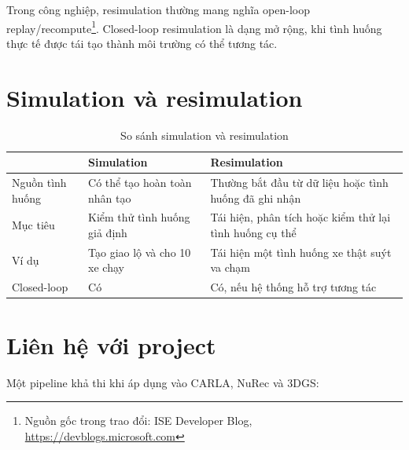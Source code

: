 Trong công nghiệp, resimulation thường mang nghĩa open-loop replay/recompute\footnote{Nguồn gốc trong trao đổi: ISE Developer Blog, \url{https://devblogs.microsoft.com}}.
Closed-loop resimulation là dạng mở rộng, khi tình huống thực tế được tái tạo thành môi trường có thể tương tác.

\section{Simulation và resimulation}

\begin{table}[H]
  \centering
  \caption{So sánh simulation và resimulation}
  \begin{tabularx}{\linewidth}{>{\raggedright\arraybackslash}p{3cm} X X}
    \toprule
     & \textbf{Simulation} & \textbf{Resimulation} \\
    \midrule
    Nguồn tình huống & Có thể tạo hoàn toàn nhân tạo & Thường bắt đầu từ dữ liệu hoặc tình huống đã ghi nhận \\
    \addlinespace
    Mục tiêu & Kiểm thử tình huống giả định & Tái hiện, phân tích hoặc kiểm thử lại tình huống cụ thể \\
    \addlinespace
    Ví dụ & Tạo giao lộ và cho 10 xe chạy & Tái hiện một tình huống xe thật suýt va chạm \\
    \addlinespace
    Closed-loop & Có & Có, nếu hệ thống hỗ trợ tương tác \\
    \bottomrule
  \end{tabularx}
\end{table}

\section{Liên hệ với project}

Một pipeline khả thi khi áp dụng vào CARLA, NuRec và 3DGS:


